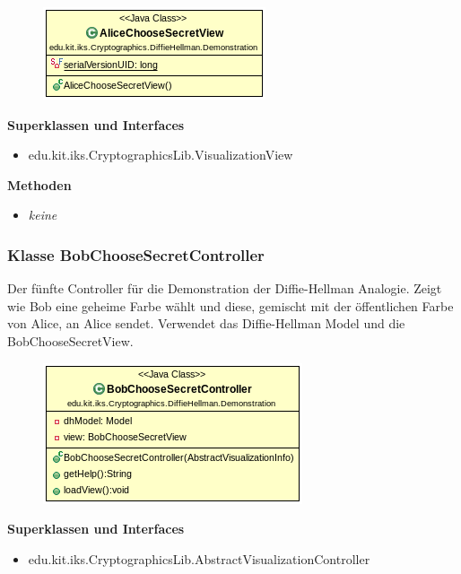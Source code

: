 \documentclass{article}
\begin{document}
      \begin{figure}[H]
        \centering
        \includegraphics{resources/edu-kit-iks-Cryptographics-DiffieHellman-Demonstration-AliceChooseSecretView}
      \end{figure}

      \textbf{Superklassen und Interfaces}
      \begin{itemize}
        \item edu.kit.iks.CryptographicsLib.VisualizationView
      \end{itemize}

      \textbf{Methoden}
      \begin{itemize}
        \item \textit{keine}
      \end{itemize}

\subsubsection{Klasse BobChooseSecretController}
      Der fünfte Controller für die Demonstration der Diffie-Hellman Analogie.
      Zeigt wie Bob eine geheime Farbe wählt und diese, gemischt mit
      der öffentlichen Farbe von Alice, an Alice sendet.
      Verwendet das Diffie-Hellman Model und die BobChooseSecretView.

      \begin{figure}[H]
        \centering
        \includegraphics{resources/edu-kit-iks-Cryptographics-DiffieHellman-Demonstration-BobChooseSecretController}
      \end{figure}

      \textbf{Superklassen und Interfaces}
      \begin{itemize}
        \item edu.kit.iks.CryptographicsLib.AbstractVisualizationController
      \end{itemize}
\end{document}
